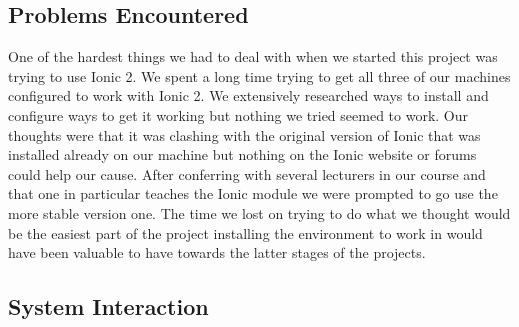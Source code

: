 \subsection{Problems Encountered}
One of the hardest things we had to deal with when we started this project was trying to use Ionic 2. We spent a long time trying to get all three of our machines configured to work with Ionic 2. We extensively researched ways to install and configure ways to get it working but nothing we tried seemed to work. Our thoughts were that it was clashing with the original version of Ionic that was installed already on our machine but nothing on the Ionic website or forums could help our cause. After conferring with several lecturers in our course and that one in particular teaches the Ionic module we were prompted to go use the more stable version one. The time we lost on trying to do what we thought would be the easiest part of the project installing the environment to work in would have been valuable to have towards the latter stages of the projects.

\subsection{System Interaction}
